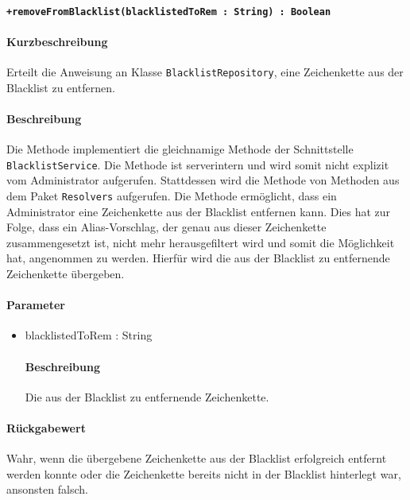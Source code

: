 \paragraph*{\texttt{+removeFromBlacklist(blacklistedToRem : String) : Boolean}}%
\paragraph*{Kurzbeschreibung}
Erteilt die Anweisung an Klasse \texttt{BlacklistRepository}, eine Zeichenkette aus der Blacklist zu entfernen.
\paragraph*{Beschreibung}
Die Methode implementiert die gleichnamige Methode der Schnittstelle \texttt{BlacklistService}.
Die Methode ist serverintern und wird somit nicht explizit vom Administrator aufgerufen.
Stattdessen wird die Methode von Methoden aus dem Paket \texttt{Resolvers} aufgerufen.
Die Methode ermöglicht, dass ein Administrator eine Zeichenkette aus der Blacklist entfernen kann.
Dies hat zur Folge, dass ein Alias-Vorschlag, der genau aus dieser Zeichenkette zusammengesetzt ist, nicht mehr herausgefiltert wird und somit die Möglichkeit hat, angenommen zu werden.
Hierfür wird die aus der Blacklist zu entfernende Zeichenkette übergeben.
\paragraph*{Parameter}
\begin{itemize}
    \item blacklistedToRem : String
    		\paragraph*{Beschreibung}
    		Die aus der Blacklist zu entfernende Zeichenkette.
\end{itemize}
\paragraph*{Rückgabewert}
Wahr, wenn die übergebene Zeichenkette aus der Blacklist erfolgreich entfernt werden konnte oder die Zeichenkette bereits nicht in der Blacklist hinterlegt war, ansonsten falsch.
